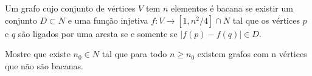 Um grafo cujo conjunto de vértices $V$ tem $n$ elementos é bacana se existir um conjunto $D \subset N$ e uma função injetiva $f: V \to [1, n^2/4] \cap N$ tal que os vértices $p$ e $q$ são ligados por uma aresta se e somente se $|f(p)-f(q)| \in D$.

Mostre que existe $n_0 \in N$ tal que para todo $n \ge n_0$ existem grafos com n vértices que não são bacanas.
